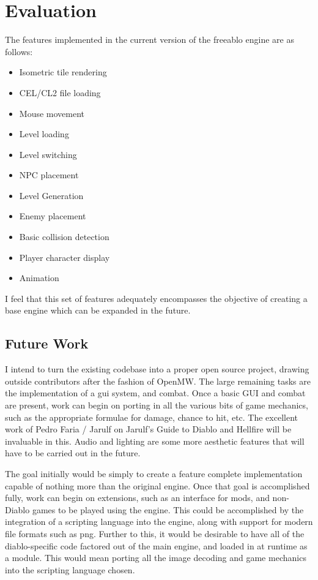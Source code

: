 \chapter{Evaluation}
	The features implemented in the current version of the freeablo engine are as follows:\\
	\begin{itemize}
		\item{Isometric tile rendering}
		\item{CEL/CL2 file loading}
		\item{Mouse movement}
		\item{Level loading}
		\item{Level switching}
		\item{NPC placement}
		\item{Level Generation}
		\item{Enemy placement}
		\item{Basic collision detection}
		\item{Player character display}
		\item{Animation}
	\end{itemize}
	
	I feel that this set of features adequately encompasses the objective of creating a base engine which can be expanded in the future.
	
	\section{Future Work}
	I intend to turn the existing codebase into a proper open source project, drawing outside contributors after the fashion of OpenMW\cite{openmw}. The large remaining tasks are the implementation of a gui system, and combat.
	Once a basic GUI and combat are present, work can begin on porting in all the various bits of game mechanics, such as the appropriate formulae for damage, chance to hit, etc. The excellent work of Pedro Faria / Jarulf on Jarulf's Guide to Diablo and Hellfire\cite{jarulf} will be invaluable in this.
	Audio and lighting are some more aesthetic features that will have to be carried out in the future. 
	
	The goal initially would be simply to create a feature complete implementation capable of nothing more than the original engine. Once that goal is accomplished fully, work can begin on extensions, such as an interface for mods, and non-Diablo games to be played using the engine.
	This could be accomplished by the integration of a scripting language into the engine, along with support for modern file formats such as png. 
	Further to this, it would be desirable to have all of the diablo-specific code factored out of the main engine, and loaded in at runtime as a module. This would mean porting all the image decoding and game mechanics into the scripting language chosen.
	

